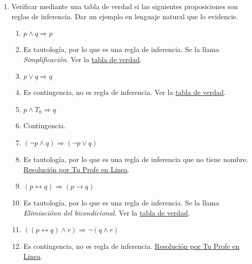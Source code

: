 \documentclass[a4paper]{article}
\newcommand{\answer}{\item[**]}
\newcommand{\exercise}{\item}
\newcommand{\then}{\to}
\newcommand{\eq}{\leftrightarrow}
\newcommand{\Then}{\Rightarrow}
\begin{document}
\begin{enumerate}
\begin{multicols}{2}
\begin{enumerate} [label=(\alph*)]
		\item $p\then  (q\land r)$
		\answer DNF: $(p\land q\land r) \lor  (\neg p\land q\land r) \lor  (\neg p\land q\land \neg r) \lor  (\neg p\land \neg q\land r) \lor  (\neg p\land \neg q\land \neg r)$  \\ CNF: $(\neg p\lor \neg q\lor r) \land  (\neg p\lor q\lor \neg r) \land  (\neg p\lor q\lor r)$

	\end{enumerate}
	\end{multicols}


	\exercise Verificar mediante una tabla de verdad si las siguientes proposiciones son reglas de inferencia. Dar un ejemplo en lenguaje natural que lo evidencie.
	\begin{multicols}{2}
	\begin{enumerate} [label=(\alph*)]

		\item $p \land q \Then p$
		\answer Es tautología, por lo que es una regla de inferencia. Se la llama \textit{Simplificación}. Ver la \href{https://www.wolframalpha.com/input?i=%28p+and+q%29+%3D%3E+p}{tabla de verdad}.

		\item $p\lor q \Then  q$
		\answer Es contingencia, no es regla de inferencia. Ver la \href{https://www.wolframalpha.com/input?i=%28p+or+q%29+%3D%3E+q}{tabla de verdad}.

		\item $p \land  T_0 \Then  q$
		\answer Contingencia.

		\item $(\neg p \land q) \Then (\neg p \lor q)$
		\answer Es tautología, por lo que es una regla de inferencia que no tiene nombre. \href{https://youtu.be/NZSuHeymu4M?t=382}{Resolución por Tu Profe en Linea}.

		\item $(p\eq q) \Then  (p\then q)$
		\answer Es tautología, por lo que es una regla de inferencia. Se la llama \textit{Elimiaciónn del bicondicional}. Ver la \href{https://www.wolframalpha.com/input?i=%28p%3C%3D%3Eq%29+%3D%3E+%28p%3D%3Eq%29}{tabla de verdad}.

		\item $((p \eq q) \land r ) \Then \neg (q \land r)$
		\answer Es contingencia, no es regla de inferencia. \href{https://youtu.be/NZSuHeymu4M?t=829}{Resolución por Tu Profe en Linea}.

	\end{enumerate}
	\end{multicols}


\end{enumerate}
\end{document}
